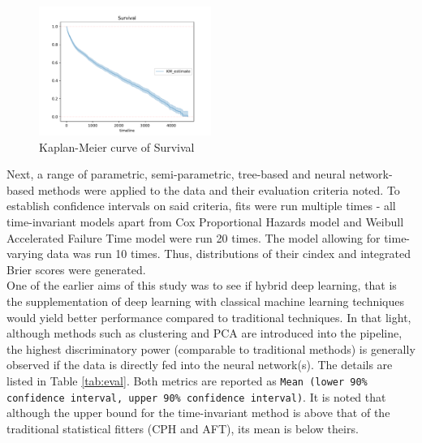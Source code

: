 \documentclass[%
 reprint,
 amsmath,amssymb,
 aps,nofootinbib
]{revtex4-2}
\begin{document}
\begin{figure}[H]
  \centering
  \includegraphics[width=0.5\textwidth]{km_curve.pdf}
  \caption{Kaplan-Meier curve of Survival}
  \label{fig:km_curve}
\end{figure}

Next, a range of parametric, semi-parametric, tree-based and neural network-based methods were applied to the data and their evaluation criteria noted. To establish confidence intervals on said criteria, fits were run multiple times - all time-invariant models apart from Cox Proportional Hazards model and Weibull Accelerated Failure Time model were run 20 times. The model allowing for time-varying data was run 10 times. Thus, distributions of their cindex and integrated Brier scores were generated. \\

One of the earlier aims of this study was to see if hybrid deep learning, that is the supplementation of deep learning with classical machine learning techniques would yield better performance compared to traditional techniques. In that light, although methods such as clustering and PCA are introduced into the pipeline, the highest discriminatory power (comparable to traditional methods) is generally observed if the data is directly fed into the neural network(s). The details are listed in Table \ref{tab:eval}. Both metrics are reported as \texttt{Mean (lower 90\% confidence interval, upper 90\% confidence interval)}. It is noted that although the upper bound for the time-invariant method is above that of the traditional statistical fitters (CPH and AFT), its mean is below theirs.
\end{document}
